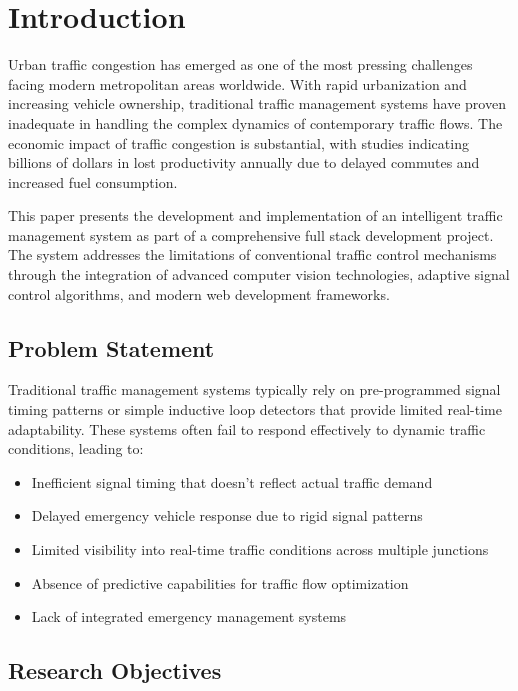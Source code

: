 \documentclass[conference]{IEEEtran}
\begin{document}
\section{Introduction}

Urban traffic congestion has emerged as one of the most pressing challenges facing modern metropolitan areas worldwide. With rapid urbanization and increasing vehicle ownership, traditional traffic management systems have proven inadequate in handling the complex dynamics of contemporary traffic flows. The economic impact of traffic congestion is substantial, with studies indicating billions of dollars in lost productivity annually due to delayed commutes and increased fuel consumption.

This paper presents the development and implementation of an intelligent traffic management system as part of a comprehensive full stack development project. The system addresses the limitations of conventional traffic control mechanisms through the integration of advanced computer vision technologies, adaptive signal control algorithms, and modern web development frameworks.

\subsection{Problem Statement}

Traditional traffic management systems typically rely on pre-programmed signal timing patterns or simple inductive loop detectors that provide limited real-time adaptability. These systems often fail to respond effectively to dynamic traffic conditions, leading to:

\begin{itemize}
\item Inefficient signal timing that doesn't reflect actual traffic demand
\item Delayed emergency vehicle response due to rigid signal patterns
\item Limited visibility into real-time traffic conditions across multiple junctions
\item Absence of predictive capabilities for traffic flow optimization
\item Lack of integrated emergency management systems
\end{itemize}

\subsection{Research Objectives}
\end{document}
